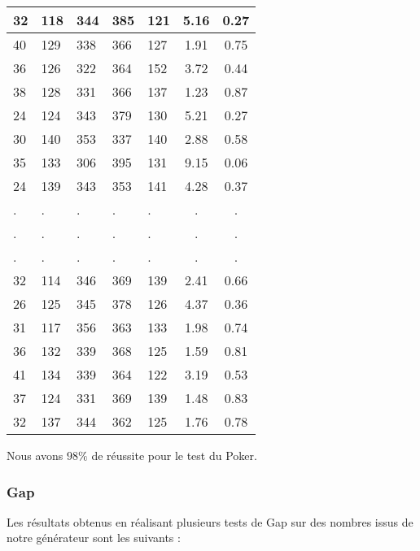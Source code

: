 \documentclass[12pt,a4paper]{article}
\begin{document}
\begin{center}
\begin{tabular}{|l|l|l|l|l|c|c|}
32 & 118 & 344 & 385 & 121 &  5.16 &  0.27\\ \hline
40 & 129 & 338 & 366 & 127 &  1.91 &  0.75\\ \hline
36 & 126 & 322 & 364 & 152 &  3.72 &  0.44\\ \hline
38 & 128 & 331 & 366 & 137 &  1.23 &  0.87\\ \hline
24 & 124 & 343 & 379 & 130 &  5.21 &  0.27\\ \hline
30 & 140 & 353 & 337 & 140 &  2.88 &  0.58\\ \hline
35 & 133 & 306 & 395 & 131 &  9.15 &  0.06\\ \hline
24 & 139 & 343 & 353 & 141 &  4.28 &  0.37\\ \hline
 . & . & . & . & . & . & . \\ \hline
 . & . & . & . & . & . & . \\ \hline
 . & . & . & . & . & . & . \\ \hline
32 & 114 & 346 & 369 & 139 &  2.41 &  0.66\\ \hline
26 & 125 & 345 & 378 & 126 &  4.37 &  0.36\\ \hline
31 & 117 & 356 & 363 & 133 &  1.98 &  0.74\\ \hline
36 & 132 & 339 & 368 & 125 &  1.59 &  0.81\\ \hline
41 & 134 & 339 & 364 & 122 &  3.19 &  0.53\\ \hline
37 & 124 & 331 & 369 & 139 &  1.48 &  0.83\\ \hline
32 & 137 & 344 & 362 & 125 &  1.76 &  0.78\\ \hline
\end{tabular}
\end{center}
Nous avons $98\%$ de réussite pour le test du Poker.

\subsubsection{Gap}

Les résultats obtenus en réalisant plusieurs tests de Gap sur des nombres issus
de notre générateur sont les suivants :
\end{document}

